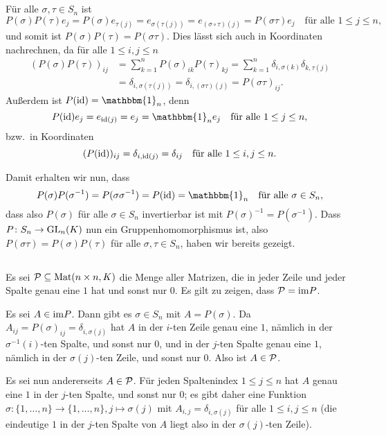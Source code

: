 \documentclass[a4paper,10pt]{article}
\begin{document}
\subsection{}
Für alle $\sigma, \tau \in S_n$ ist
\[
 P(\sigma) P(\tau) e_j
 = P(\sigma) e_{\tau(j)}
 = e_{\sigma(\tau(j))}
 = e_{(\sigma \circ \tau)(j)}
 = P(\sigma \tau) e_j
 \quad
 \text{für alle $1 \leq j \leq n$},
\]
und somit ist $P(\sigma)P(\tau) = P(\sigma \tau)$. Dies lässt sich auch in Koordinaten nachrechnen, da für alle $1 \leq i,j \leq n$
\begin{align*}
 (P(\sigma)P(\tau))_{ij}
 &= \sum_{k=1}^n P(\sigma)_{ik} P(\tau)_{kj}
 = \sum_{k=1}^n \delta_{i,\sigma(k)} \delta_{k,\tau(j)} \\
 &= \delta_{i,\sigma(\tau(j))}
 = \delta_{i,(\sigma \tau)(j)}
 = P(\sigma \tau)_{ij}.
\end{align*}
Außerdem ist $P(\id) = \mathbbm{1}_n$, denn
\[
 P(\id) e_j = e_{\id(j)} = e_j = \mathbbm{1}_n e_j
 \quad
 \text{für alle $1 \leq j \leq n$},
\]
bzw.\ in Koordinaten
\[
 (P(\mathrm{id}))_{ij} = \delta_{i,\mathrm{id}(j)} = \delta_{ij}
 \quad
 \text{für alle $1 \leq i,j \leq n$}.
\]

Damit erhalten wir nun, dass
\[
 P(\sigma) P(\sigma^{-1})
 = P(\sigma \sigma^{-1})
 = P(\id)
 = \mathbbm{1}_n
 \quad
 \text{für alle $\sigma \in S_n$},
\]
dass also $P(\sigma)$ für alle $\sigma \in S_n$ invertierbar ist mit $P(\sigma)^{-1} = P(\sigma^{-1})$. Dass $P \colon S_n \to \mathrm{GL}_n(K)$ nun ein Gruppenhomomorphismus ist, also $P(\sigma \tau) = P(\sigma) P(\tau)$ für alle $\sigma, \tau \in S_n$, haben wir bereits gezeigt.



\subsection{}
Es sei $\mathcal{P} \subseteq \mathrm{Mat}(n \times n, K)$ die Menge aller Matrizen, die in jeder Zeile und jeder Spalte genau eine $1$ hat und sonst nur $0$. Es gilt zu zeigen, dass $\mathcal{P} = \mathrm{im} P$.

Es sei $A \in \mathrm{im} P$. Dann gibt es $\sigma \in S_n$ mit $A = P(\sigma)$. Da $A_{ij} = P(\sigma)_{ij} = \delta_{i,\sigma(j)}$ hat $A$ in der $i$-ten Zeile genau eine $1$, nämlich in der $\sigma^{-1}(i)$-ten Spalte, und sonst nur $0$, und in der $j$-ten Spalte genau eine $1$, nämlich in der $\sigma(j)$-ten Zeile, und sonst nur $0$. Also ist $A \in \mathcal{P}$.

Es sei nun andererseits $A \in \mathcal{P}$. Für jeden Spaltenindex $1 \leq j \leq n$ hat $A$ genau eine $1$ in der $j$-ten Spalte, und sonst nur $0$; es gibt daher eine Funktion $\sigma \colon \{1, \dotsc, n\} \to \{1, \dotsc, n\}, j \mapsto \sigma(j)$ mit $A_{i,j} = \delta_{i,\sigma(j)}$ für alle $1 \leq i,j \leq n$ (die eindeutige $1$ in der $j$-ten Spalte von $A$ liegt also in der $\sigma(j)$-ten Zeile).
\end{document}
